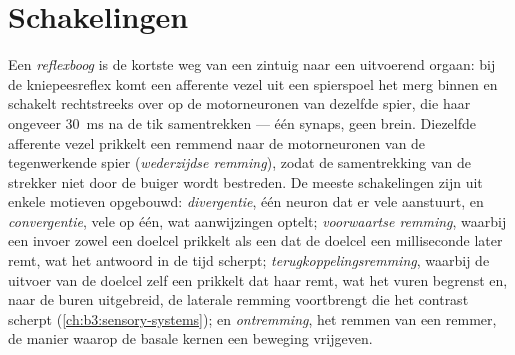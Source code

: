 \section{Schakelingen}

\begin{definition}\label{def:b3:nervous-systems:circuits}
Een \emph{reflexboog} is de kortste weg van een zintuig naar een
uitvoerend orgaan: bij de kniepeesreflex komt een afferente vezel uit
een spierspoel het merg binnen en schakelt rechtstreeks over op de
motorneuronen van dezelfde spier, die haar ongeveer \qty{30}{ms} na de
tik samentrekken --- één synaps, geen brein. Diezelfde afferente vezel
prikkelt een remmend  naar de motorneuronen van de
tegenwerkende spier (\emph{wederzijdse remming}), zodat de
samentrekking van de strekker niet door de buiger wordt bestreden. De
meeste schakelingen zijn uit enkele motieven opgebouwd:
\emph{divergentie}, één neuron dat er vele aanstuurt, en
\emph{convergentie}, vele op één, wat aanwijzingen optelt;
\emph{voorwaartse remming}, waarbij een invoer zowel een doelcel
prikkelt als een  dat de doelcel een milliseconde later
remt, wat het antwoord in de tijd scherpt;
\emph{terugkoppelingsremming}, waarbij de uitvoer van de doelcel zelf
een  prikkelt dat haar remt, wat het vuren begrenst en, naar
de buren uitgebreid, de laterale remming voortbrengt die het contrast
scherpt (\cref{ch:b3:sensory-systems}); en \emph{ontremming}, het
remmen van een remmer, de manier waarop de basale kernen een beweging
vrijgeven.
\end{definition}

